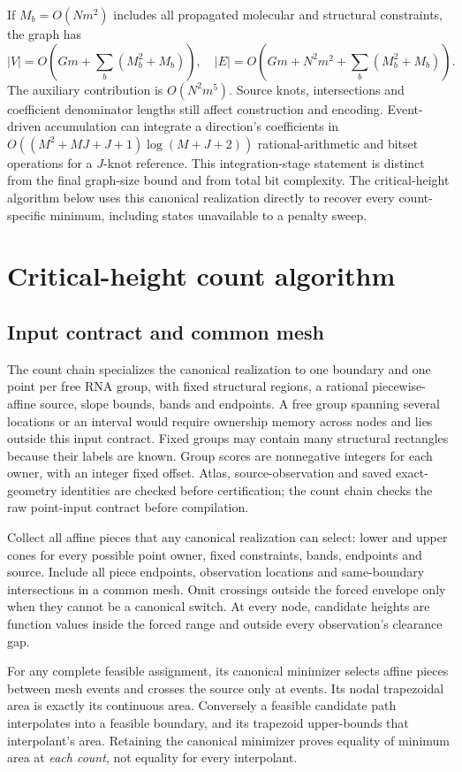 \documentclass[10pt,letterpaper]{article}
\begin{document}
If $M_b=O(Nm^2)$ includes all propagated molecular and structural constraints, the graph has
\[
 |V|=O\!\left(Gm+\sum_b(M_b^2+M_b)\right),\quad
 |E|=O\!\left(Gm+N^2m^2+\sum_b(M_b^2+M_b)\right).
\]
The auxiliary contribution is $O(N^2m^5)$. Source knots, intersections and coefficient denominator lengths still affect construction and encoding. Event-driven accumulation can integrate a direction's coefficients in $O((M^2+MJ+J+1)\log(M+J+2))$ rational-arithmetic and bitset operations for a $J$-knot reference. This integration-stage statement is distinct from the final graph-size bound and from total bit complexity. The critical-height algorithm below uses this canonical realization directly to recover every count-specific minimum, including states unavailable to a penalty sweep.

\section{Critical-height count algorithm}
\FloatBarrier
\subsection{Input contract and common mesh}
The count chain specializes the canonical realization to one boundary and one point per free RNA group, with fixed structural regions, a rational piecewise-affine source, slope bounds, bands and endpoints. A free group spanning several locations or an interval would require ownership memory across nodes and lies outside this input contract. Fixed groups may contain many structural rectangles because their labels are known. Group scores are nonnegative integers for each owner, with an integer fixed offset. Atlas, source-observation and saved exact-geometry identities are checked before certification; the count chain checks the raw point-input contract before compilation.

Collect all affine pieces that any canonical realization can select: lower and upper cones for every possible point owner, fixed constraints, bands, endpoints and source. Include all piece endpoints, observation locations and same-boundary intersections in a common mesh. Omit crossings outside the forced envelope only when they cannot be a canonical switch. At every node, candidate heights are function values inside the forced range and outside every observation's clearance gap.

For any complete feasible assignment, its canonical minimizer selects affine pieces between mesh events and crosses the source only at events. Its nodal trapezoidal area is exactly its continuous area. Conversely a feasible candidate path interpolates into a feasible boundary, and its trapezoid upper-bounds that interpolant's area. Retaining the canonical minimizer proves equality of minimum area at \emph{each count}, not equality for every interpolant.
\end{document}
